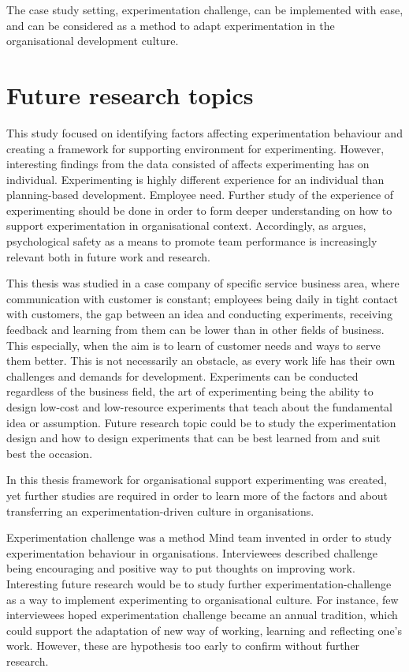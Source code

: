 The case study setting, experimentation challenge, can be implemented with ease, and can be considered as a method to adapt experimentation in the organisational development culture. 

\section{Future research topics}
This study focused on identifying factors affecting experimentation behaviour and creating a framework for supporting environment for experimenting. However, interesting findings from the data consisted of affects experimenting has on individual. Experimenting is highly different experience for an individual than planning-based development. Employee need. Further study of the experience of experimenting should be done in order to form deeper understanding on how to support experimentation in organisational context. Accordingly, as \citet{edmondson1999psychological} argues, psychological safety as a means to promote team performance is increasingly relevant both in future work and research. 

This thesis was studied in a case company of specific service business area, where communication with customer is constant; employees being daily in tight contact with customers, the gap between an idea and conducting experiments, receiving feedback and learning from them can be lower than in other fields of business. This especially, when the aim is to learn of customer needs and ways to serve them better. This is not necessarily an obstacle, as every work life has their own challenges and demands for development. Experiments can be conducted regardless of the business field, the art of experimenting being the ability to design low-cost and low-resource experiments that teach about the fundamental idea or assumption. Future research topic could be to study the experimentation design and how to design experiments that can be best learned from and suit best the occasion. 

In this thesis framework for organisational support experimenting was created, yet further studies are required in order to learn more of the factors and about transferring an experimentation-driven culture in organisations. 

Experimentation challenge was a method Mind team invented in order to study experimentation behaviour in organisations. Interviewees described challenge being encouraging and positive way to put thoughts on improving work. Interesting future research would be to study further experimentation-challenge as a way to implement experimenting to organisational culture. For instance, few interviewees hoped experimentation challenge became an annual tradition, which could support the adaptation of new way of working, learning and reflecting one's work. However, these are hypothesis too early to confirm without further research. 

